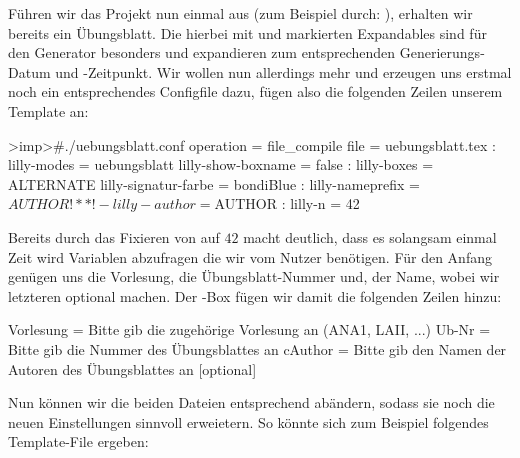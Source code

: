 Führen wir das Projekt nun einmal aus (zum Beispiel durch: ), erhalten wir bereits ein Übungsblatt. Die hierbei mit  und  markierten Expandables sind für den Generator besonders und expandieren zum entsprechenden Generierungs-Datum und -Zeitpunkt.
Wir wollen nun allerdings mehr und erzeugen uns erstmal noch ein entsprechendes Configfile dazu, fügen also die folgenden Zeilen unserem Template an:
\begin{gepard}
>imp>#./uebungsblatt.conf
operation   = file_compile
file        = uebungsblatt.tex
:
lilly-modes = uebungsblatt
lilly-show-boxname = false
:
lilly-boxes = ALTERNATE
lilly-signatur-farbe = bondiBlue
:
lilly-nameprefix = ${AUTHOR}!**!-
lilly-author = ${AUTHOR}
:
lilly-n     = 42
\end{gepard}
Bereits durch das Fixieren von  auf $42$ macht deutlich, dass es solangsam einmal Zeit wird Variablen abzufragen die wir vom Nutzer benötigen. Für den Anfang genügen uns die Vorlesung, die Übungsblatt-Nummer und, der Name, wobei wir letzteren optional machen. Der -Box fügen wir damit die folgenden Zeilen hinzu:
{
\begin{plaingepard}
Vorlesung = Bitte gib die zugehörige Vorlesung an (ANA1, LAII, ...)
Ub-Nr     = Bitte gib die Nummer des Übungsblattes an
cAuthor   = Bitte gib den Namen der Autoren des Übungsblattes an [optional]
\end{plaingepard}
}
Nun können wir die beiden Dateien entsprechend abändern, sodass sie noch die neuen Einstellungen sinnvoll erweietern. So könnte sich zum Beispiel folgendes Template-File ergeben:
